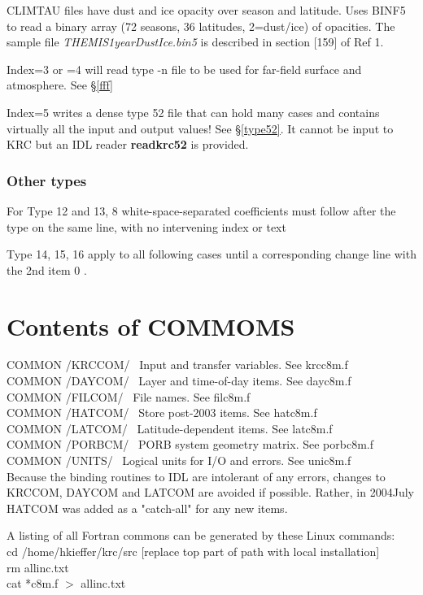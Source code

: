\documentclass{article}
\newcommand{\np}{\textbf}  %
\newcommand{\nf}{\textit}  %
\begin{document}
CLIMTAU files have dust and ice opacity over season and latitude. Uses BINF5 to
read a binary array (72 seasons, 36 latitudes, 2=dust/ice) of opacities. The
sample file \nf{THEMIS1yearDustIce.bin5} is described in section [159] of Ref 1.

Index=3 or =4 will read type -n file to be used for far-field surface and atmosphere.  See \S \ref{fff}

Index=5 writes a dense type 52 file that can hold many cases and contains virtually all the input and output values! See \S \ref{type52}. It cannot be input to KRC but an IDL reader \np{readkrc52} is provided.

\subsubsection{Other types}
For Type 12 and 13, 8 white-space-separated coefficients must follow after 
the type on the same line, with no intervening index or text 

Type 14, 15, 16 apply to all following cases until a corresponding change line
with the 2nd item 0 .
 

\section{Contents of COMMOMS } %
 COMMON /KRCCOM/ \ Input and transfer variables. See krcc8m.f  
\\ COMMON /DAYCOM/ \ Layer and time-of-day items. See dayc8m.f  
\\ COMMON /FILCOM/ \ File names. See filc8m.f  
\\ COMMON /HATCOM/ \ Store post-2003 items. See hatc8m.f  
\\ COMMON /LATCOM/ \ Latitude-dependent items. See latc8m.f  
\\ COMMON /PORBCM/ \ PORB system geometry matrix.  See porbc8m.f  
\\ COMMON /UNITS/ \ Logical units for I/O and errors.  See unic8m.f  \\

Because the binding routines to IDL are intolerant of any errors, changes to
KRCCOM, DAYCOM and LATCOM are avoided if possible. Rather, in 2004July HATCOM
was added as a "catch-all" for any new items.

A listing of all Fortran commons can be generated by these Linux commands: \\ 
cd /home/hkieffer/krc/src [replace top part of path with local installation] \\ 
rm allinc.txt \\ 
cat  *c8m.f $>$ allinc.txt 
\pagebreak
              
\end{document}
